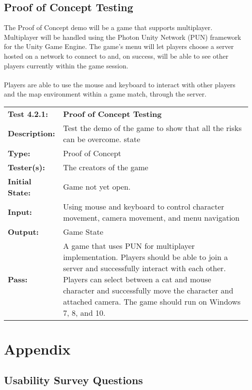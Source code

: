 \documentclass[12pt, titlepage]{article}
\begin{document}
\subsection{Proof of Concept Testing}
The Proof of Concept demo will be a game that supports multiplayer. Multiplayer will be handled using the Photon Unity Network (PUN) framework for the Unity Game Engine. 
The game's menu will let players choose a server hosted on a network to connect to and, on success, will be able to see other players currently within the game session.

\paragraph{}
Players are able to use the mouse and keyboard to interact with other players and the map environment within a game match, through the server.

\begin{mdframed}[linewidth=1pt]
\begin{tabularx}{\textwidth}{@{}p{3cm}X@{}}
{\bf Test 4.2.1:} & {\bf Proof of Concept Testing}\\[\baselineskip]
{\bf Description:} & Test the demo of the game to show that all the risks can be overcome. state\\[0.5\baselineskip]
{\bf Type:} & Proof of Concept\\[0.5\baselineskip]
{\bf Tester(s):} & The creators of the game\\[0.5\baselineskip]
{\bf Initial State:} & Game not yet open.\\[0.5\baselineskip]
{\bf Input:} & Using mouse and keyboard to control character movement, camera movement, and menu navigation\\[0.5\baselineskip]
{\bf Output:} & Game State\\[0.5\baselineskip]
{\bf Pass:} & A game that uses PUN for multiplayer implementation. Players should be able to join a server and successfully interact with each other. Players can select between a cat and mouse character and successfully move the character and attached camera. The game should run on Windows 7, 8, and 10.
\end{tabularx}
\end{mdframed}


\newpage
\section{Appendix}

\subsection{Usability Survey Questions}
\end{document}
